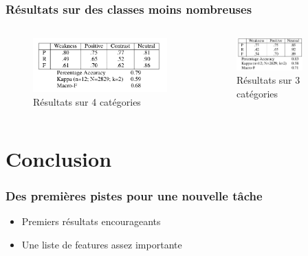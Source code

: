 \documentclass[10pt]{beamer}
\begin{document}
\begin{frame}
  \frametitle{Résultats sur des classes moins nombreuses}
     \begin{columns}[t]
      \begin{column}{0.5\textwidth}
        \begin{figure}[h]
          \centering
          \includegraphics[width=\textwidth]{shortres4}
          \caption{Résultats sur 4 catégories}
          \label{fig:res4}
        \end{figure}
      \end{column}
      \begin{column}{0.5\textwidth}
       \begin{figure}[h]
          \centering
          \includegraphics[width=0.75\textwidth]{shortres3}
          \caption{Résultats sur 3 catégories}
          \label{fig:res3}
        \end{figure}
      \end{column}
   \end{columns}
\end{frame}

\section{Conclusion}
\label{sec:conclusion}

\begin{frame}
  \frametitle{Des premières pistes pour une nouvelle tâche}
  \begin{itemize}
  \item Premiers résultats encourageants 
  \item Une liste de features assez importante
  \end{itemize}

\end{frame}
\end{document}
